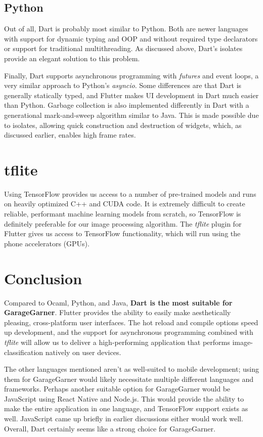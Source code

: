 \subsection{Python}

Out of all, Dart is probably most similar to Python. Both are newer languages with support for dynamic typing and OOP and without 
required type declarators or support for traditional multithreading. As discussed above, Dart's isolates provide an elegant solution to this 
problem. 

Finally, Dart supports asynchronous programming with \emph{futures} and event loops, a very similar approach to Python's \emph{asyncio}. 
Some differences are that Dart is generally statically typed, and Flutter makes UI development in Dart much easier than Python. Garbage collection 
is also implemented differently in Dart with a generational mark-and-sweep algorithm similar to Java. This is made possible due to isolates, allowing
quick construction and destruction of widgets, which, as discussed earlier, enables high frame rates.

\section{tflite}
Using TensorFlow provides us access to a number of pre-trained models and runs on heavily optimized C++ and CUDA code. 
It is extremely difficult to create reliable, performant machine learning models from scratch, so TensorFlow is definitely preferable
for our image processing algorithm. The \emph{tflite} plugin for Flutter gives us access to TensorFlow functionality, which will run
using the phone accelerators (GPUs).
 
\section{Conclusion}
Compared to Ocaml, Python, and Java, \textbf{Dart is the most suitable for GarageGarner}. Flutter provides the ability to easily make 
aesthetically pleasing, cross-platform user interfaces. The hot reload and compile options speed up development, and the support for
asynchronous programming combined with \emph{tflite} will allow us to deliver a high-performing application that performs
image-classification natively on user devices. 

The other languages mentioned aren't as well-suited to mobile development; using them for GarageGarner would likely necessitate multiple different 
languages and frameworks. Perhaps another suitable option for GarageGarner would be JavaScript using React Native and Node.js. This would provide
the ability to make the entire application in one language, and TensorFlow support exists as well. JavaScript came up briefly in earlier discussions
either would work well. Overall, Dart certainly seems like a strong choice for GarageGarner.
